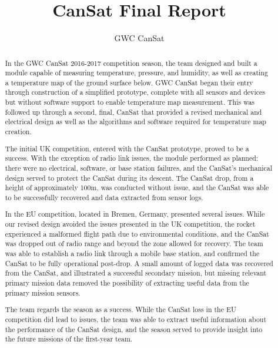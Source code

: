 \documentclass[]{report}
\title{CanSat Final Report}
\author{GWC CanSat}
\begin{document}
	\maketitle
	\tableofcontents
	\listoffigures
	
	\begin{abstract}
		\label{abstract}
		In the GWC CanSat 2016-2017 competition season, the team designed and built a module capable of measuring temperature, pressure, and humidity, as well as creating a temperature map of the ground surface below. GWC CanSat began their entry through construction of a simplified prototype, complete with all sensors and devices but without software support to enable temperature map measurement. This was followed up through a second, final, CanSat that provided a revised mechanical and electrical design as well as the algorithms and software required for temperature map creation.
		
		The initial UK competition, entered with the CanSat prototype, proved to be a success. With the exception of radio link issues, the module performed as planned: there were no electrical, software, or base station failures, and the CanSat's mechanical design served to protect the CanSat during its descent. The CanSat drop, from a height of approximately 100m, was conducted without issue, and the CanSat was able to be successfully recovered and data extracted from sensor logs.
		
		In the EU competition, located in Bremen, Germany, presented several issues. While our revised design avoided the issues presented in the UK competition, the rocket experienced a malformed flight path due to environmental conditions, and the CanSat was dropped out of radio range and beyond the zone allowed for recovery. The team was able to establish a radio link through a mobile base station, and confirmed the CanSat to be fully operational post-drop. A small amount of logged data was recovered from the CanSat, and illustrated a successful secondary mission, but missing relevant primary mission data removed the possibility of extracting useful data from the primary mission sensors.
		
		The team regards the season as a success. While the CanSat loss in the EU competition did lead to issues, the team was able to extract useful information about the performance of the CanSat design, and the season served to provide insight into the future missions of the first-year team.
	\end{abstract}
\end{document}
